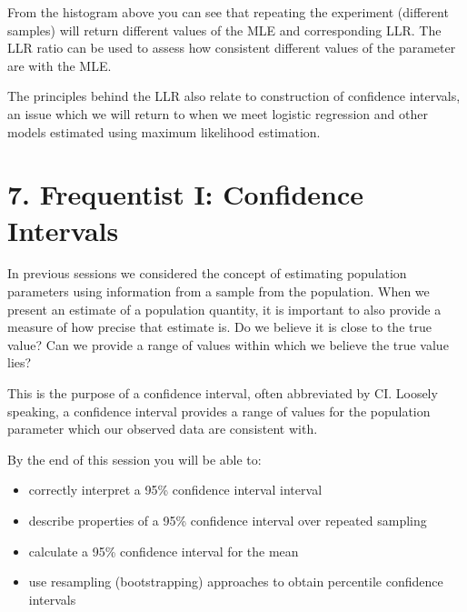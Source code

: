\documentclass[letterpaper,10pt,english]{jupyterBook}
\begin{document}
\noindent{}

\sphinxAtStartPar
From the histogram above you can see that repeating the experiment (different samples) will return different values of the MLE and corresponding LLR. The LLR ratio can be used to assess how consistent different values of the parameter are with the MLE.

\sphinxAtStartPar
The principles behind the LLR also relate to construction of confidence intervals, an issue which we will return to when we meet logistic regression and other models estimated using maximum likelihood estimation.


\chapter{7. Frequentist I: Confidence Intervals}
\label{\detokenize{07.a. Frequentist I:frequentist-i-confidence-intervals}}\label{\detokenize{07.a. Frequentist I::doc}}
\sphinxAtStartPar
In previous sessions we considered the concept of estimating population parameters using information from a sample from the population. When we present an estimate of a population quantity, it is important to also provide a measure of how precise that estimate is. Do we believe it is close to the true value? Can we provide a range of values within which we believe the true value lies?

\sphinxAtStartPar
This is the purpose of a confidence interval, often abbreviated by CI. Loosely speaking, a confidence interval provides a range of values for the population parameter which our observed data are consistent with.



\sphinxAtStartPar
By the end of this session you will be able to:
\begin{itemize}
\item {} 
\sphinxAtStartPar
correctly interpret a 95\% confidence interval interval

\item {} 
\sphinxAtStartPar
describe properties of a 95\% confidence interval over repeated sampling

\item {} 
\sphinxAtStartPar
calculate a 95\% confidence interval for the mean

\item {} 
\sphinxAtStartPar
use resampling (bootstrapping) approaches to obtain percentile confidence intervals

\end{itemize}
\end{document}
